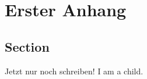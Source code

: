 \chapter{Erster Anhang} \label{cha:anhangA}

\section{Section}

Jetzt nur noch schreiben!  I am a child.



